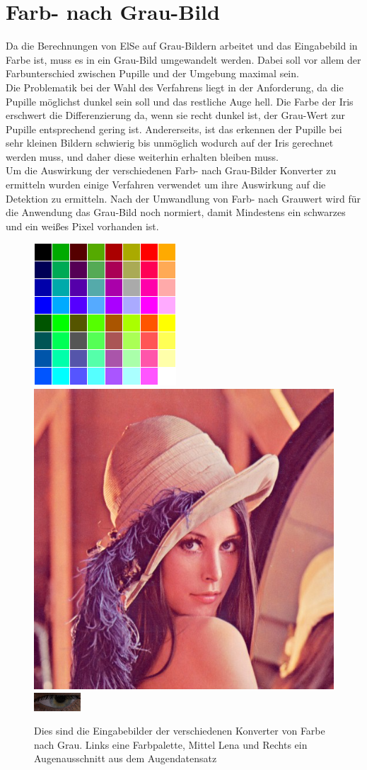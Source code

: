 \section{Farb- nach Grau-Bild}
Da die Berechnungen von ElSe auf Grau-Bildern arbeitet und das Eingabebild in Farbe ist, muss es in ein Grau-Bild umgewandelt werden. Dabei soll vor allem der Farbunterschied zwischen Pupille und der Umgebung maximal sein.\\
Die Problematik bei der Wahl des Verfahrens liegt in der Anforderung, da die Pupille möglichst dunkel sein soll und das restliche Auge hell. Die Farbe der Iris erschwert die Differenzierung da, wenn sie recht dunkel ist, der Grau-Wert zur Pupille entsprechend gering ist. Andererseits, ist das erkennen der Pupille bei sehr kleinen Bildern schwierig bis unmöglich wodurch auf der Iris gerechnet werden muss, und daher diese weiterhin erhalten bleiben muss.\\
Um die Auswirkung der verschiedenen Farb- nach Grau-Bilder Konverter zu  ermitteln wurden einige Verfahren verwendet um ihre Auswirkung auf die Detektion zu ermitteln. Nach der Umwandlung von Farb- nach Grauwert wird für die Anwendung das Grau-Bild noch normiert, damit Mindestens ein schwarzes und ein weißes Pixel vorhanden ist.
\begin{figure}
	\centering
	\includegraphics[width=0.2\linewidth]{img/Farbtafel2}
	\includegraphics[width=0.2\linewidth]{img/lena}
	\includegraphics[width=0.2\linewidth]{img/Auge}
	\caption{Dies sind die Eingabebilder der verschiedenen Konverter von Farbe nach Grau. Links eine Farbpalette, Mittel Lena und Rechts ein Augenausschnitt aus dem Augendatensatz \cite{database_Eye}}
	\label{img_Gray_Einagbe}
\end{figure}
